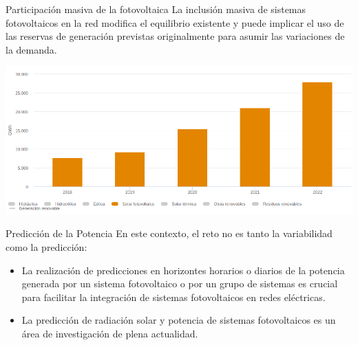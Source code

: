 \documentclass[aspectratio=169, usenames,svgnames,dvipsnames]{beamer}
\begin{document}
\begin{frame}[label={sec:org03d8d49}]{Participación masiva de la fotovoltaica}
La \alert{inclusión masiva} de sistemas fotovoltaicos en la red \alert{modifica el
equilibrio} existente y puede implicar el uso de las reservas de
generación previstas originalmente para asumir las variaciones de la
demanda.

\begin{center}
\includegraphics[height=0.6\textheight]{../figs/EvolucionGeneracionFV_REE.png}
\end{center}
\end{frame}


\begin{frame}[label={sec:orgdfa048a}]{Predicción de la Potencia}
En este contexto, el reto no es tanto la variabilidad como la
\alert{predicción}:

\begin{itemize}
\item La realización de predicciones en horizontes horarios o diarios de
la potencia generada por un sistema fotovoltaico o por un grupo de
sistemas es crucial para facilitar la integración de sistemas
fotovoltaicos en redes eléctricas.

\item La predicción de radiación solar y potencia de sistemas
fotovoltaicos es un área de investigación de plena actualidad.
\end{itemize}
\end{frame}
\end{document}
